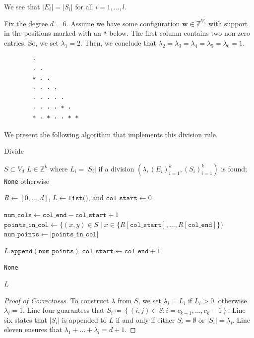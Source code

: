 \begin{remark}
    We see that \( \lvert E_i \rvert = \lvert S_i \rvert \) for all \( i = 1, \dots, l \). 
\end{remark}

\begin{example}\label{ex:decomposition-nsjkfnje}
    Fix the degree \( d=6 \). Assume we have some configuration \( \mathbf w \in \mathbb{Z}^{V_6} \) with support in the positions marked with an \texttt{*} below. The first column contains two non-zero entries. So, we set \( \lambda_1 = 2 \). Then, we conclude that \( \lambda_2 = \lambda_3 = \lambda_4 = \lambda_5 = \lambda_6 = 1\).
    \begin{verbatim}
        · 
        · · 
        * · · 
        · · · · 
        · · · · · 
        · · · · * · 
        * · * · · * *
    \end{verbatim}
\end{example}

We present the following algorithm that implements this division rule.


\begin{algorithm}[H]
\caption{Divide}
\label{alg:divide}
\begin{algorithmic}[1]
\Require \( S \subset V_d \)
\Ensure \( L \in \mathbb{Z}^{k} \) where \( L_i = \lvert S_i \rvert \) if a division \( (\lambda, (E_i)_{i=1}^k, (S_i)_{i=1}^k) \) is found; \texttt{None} otherwise

\State $R \gets [0, \dots, d]$, $L \gets \texttt{list()}$, and $\texttt{col\_start} \gets 0$

    \State $\texttt{num\_cols} \gets \texttt{col\_end} - \texttt{col\_start} + 1$
    \State $\texttt{points\_in\_col} \gets \{(x,y) \in S \mid x \in \{R[\texttt{col\_start}], \dots,  R[\texttt{col\_end}] \} \}$
    \State $\texttt{num\_points} \gets |\texttt{points\_in\_col}|$

        \State $L.\texttt{append}(\texttt{num\_points})$
        \State $\texttt{col\_start} \gets \texttt{col\_end} + 1$
    \EndIf
\EndFor

    \State \Return \texttt{None}
\EndIf

\State \Return $L$
\end{algorithmic}
\end{algorithm}

\begin{proof}[Proof of Correctness]
    To construct \( \lambda  \) from \( S \), we set \( \lambda_i = L_i \) if \( L_i > 0 \), otherwise \( \lambda_i = 1 \).
    Line four guarantees that \( S_i \coloneqq \left\{ (i,j) \in S : i = c_{k-1}, \dots, c_k - 1 \right\} \). Line six states that \( \lvert S_i \rvert \) is appended to \( L \) if and only if either \( S_i = \emptyset \) or \( \lvert S_i \rvert = \lambda_i \). Line eleven ensures that \(  \lambda_1 + \dots + \lambda_l = d+1  \).
\end{proof}




